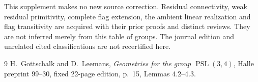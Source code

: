 \documentclass[11pt]{article}
\begin{document}
This supplement makes no new source correction. Residual connectivity,
weak residual primitivity, complete flag extension, the ambient linear
realization and flag transitivity are acquired with their prior
proofs and distinct reviews. They are not inferred merely from this
table of groups. The journal edition and unrelated cited classifications
are not recertified here.
\begin{thebibliography}{9}
 H.~Gottschalk and D.~Leemans,
\emph{Geometries for the group $\operatorname{PSL}(3,4)$},
Halle preprint 99--30, fixed 22-page edition, p.~15, Lemmas 4.2--4.3.
\end{thebibliography}
\end{document}
